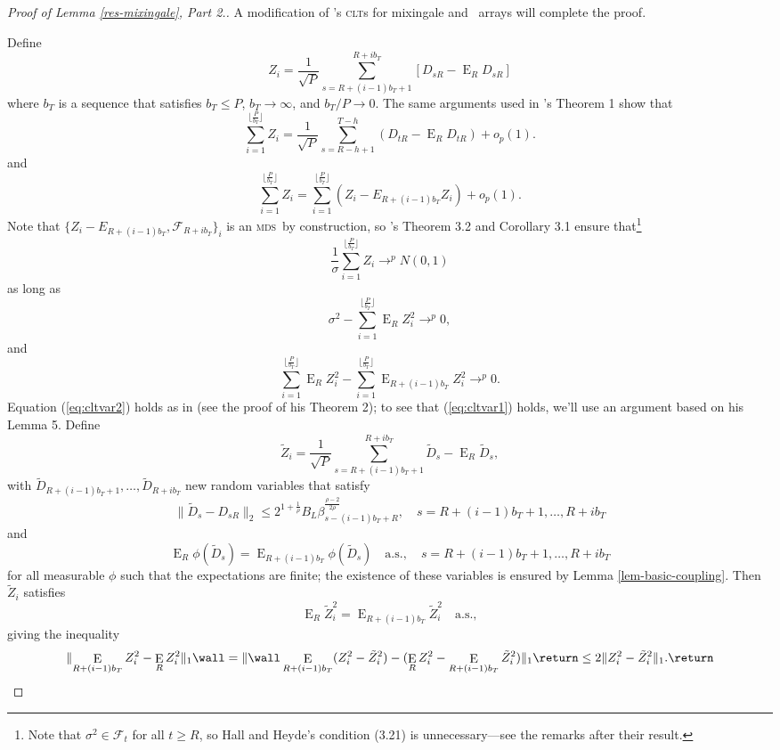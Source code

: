 \documentclass[11pt]{article}
\DeclareMathOperator{\E}{E}
\newcommand{\citepos}[1]{\citeauthor{#1}'s \citeyearpar{#1}}
\newcommand{\oosSum}[2]{\ensuremath{\sum_{#1=R-\h+#2}^{T-\h}}}
\newcommand{\h}{h}
\newcommand{\InnerBlockL}[1]{\ensuremath{R+(#1-1)b_T + 1}}
\newcommand{\InnerBlockU}[1]{\ensuremath{R+#1 b_T}}
\newcommand{\OuterBlockU}{\lfloor \frac P{b_T} \rfloor}
\newcommand{\SumOuterBlock}[1]{\ensuremath{\sum_{#1=1}^{\OuterBlockU}}}
\newcommand{\SumInnerBlock}[2]{\ensuremath{\sum_{#1=\InnerBlockL{#2}}^{\InnerBlockU{#2}}}}
\newcommand{\CEOuterBlock}[2]{\ensuremath{\E_{\InnerBlockU{(#2-1)}} #1}}
\newcommand{\ZSummand}{D_{sR} - \E_R D_{sR}}
\newcommand{\ZDef}{ \frac1{\sqrt{P}} \SumInnerBlock{s}{i} [\ZSummand]}
\newcommand{\ZSqCE}{\ensuremath{\CEOuterBlock{Z_i^2}{i}}}
\newcommand{\rhoExp}{\ensuremath{\frac{\rho-2}{2\rho}}}
\newcommand{\mds}{\textsc{mds}}
\newcommand{\clt}{\textsc{clt}}
\begin{document}
\begin{proof}[Proof of Lemma \ref{res-mixingale}, Part 2.]
  A modification of \citepos{de_jong_central_1997} \clt s for
  mixingale and \ned\ arrays will complete the proof.

Define
\[\label{eq:z1}
  Z_i = \ZDef
\]
where $b_T$ is a sequence that satisfies $b_T\leq P$,
$b_T\to\infty$, and $b_T/P\to 0$.  The same arguments used in
\citepos{de_jong_central_1997} Theorem 1 show that
\begin{equation*}
   \SumOuterBlock{i} Z_i = \frac1{\sqrt{P}} \oosSum{s}{1} (D_{tR} - \E_R D_{tR}) + o_p(1).
\end{equation*}
and
\begin{equation*}
  \SumOuterBlock{i} Z_i = \SumOuterBlock{i} (Z_i - E_{R + (i-1)b_T}
  Z_i) + o_p(1).
\end{equation*}
Note that $\{Z_i - E_{R + (i-1)b_T},\mathcal{F}_{R + i b_T}\}_i$ is an
\mds\ by construction, so \citepos{hall_martingale_1980} Theorem 3.2
and Corollary 3.1 ensure that\footnote{Note that $\sigma^2 \in
  \mathcal{F}_t$ for all $t \geq R$, so Hall and Heyde's condition
  (3.21) is unnecessary---see the remarks after their result.}
\[
\frac1{\sigma} \SumOuterBlock{i} Z_i \to^p
N(0,1)
\]
as long as
\begin{equation}\label{eq:cltvar2}
  \sigma^2 - \SumOuterBlock{i} \E_R Z_i^2 \to^p 0,
\end{equation}
and
\begin{equation}\label{eq:cltvar1}
  \SumOuterBlock{i} \E_R Z_i^2 - \SumOuterBlock{i} \ZSqCE \to^p 0.
\end{equation}
Equation (\ref{eq:cltvar2}) holds as in \citet{de_jong_central_1997}
(see the proof of his Theorem 2); to see that (\ref{eq:cltvar1})
holds, we'll use an argument based on his Lemma 5.  Define
\[
\tilde Z_i = \frac1{\sqrt{P}} \SumInnerBlock{s}{i} \tilde D_s -
\E_R \tilde D_s,
\]
with $\tilde D_{R+(i-1)b_T + 1},\dots,\tilde D_{R+ib_T}$ new random
variables that satisfy
\[
\lVert \tilde D_s - D_{sR} \rVert_2 \leq 2^{1 + \frac1\rho} B_L \beta_{s -
  (i-1)b_T + R}^{\rhoExp}, \quad s = R+(i-1)b_T + 1,\dots,R+i b_T
\]
and
\[
\E_R \phi(\tilde D_s) = \E_{R+(i-1)b_T} \phi(\tilde D_s) \quad \text{a.s.}, \quad s = R+(i-1)b_T + 1,\dots,R+i b_T
\]
for all measurable $\phi$ such that the expectations are finite; the
existence of these variables is ensured by Lemma
\ref{lem-basic-coupling}.  Then $\tilde Z_i$ satisfies
\[
\E_R \tilde Z_i^2 = \CEOuterBlock{\tilde Z_i^2}{i} \quad \text{a.s.},
\]
giving the inequality
\[
\lVert \ZSqCE - \E_R Z_i^2 \rVert_1 \wall= \lVert \wall\CEOuterBlock{(Z_i^2 -
  \tilde Z_i^2)}{i} \\ - (\E_R Z_i^2 - \CEOuterBlock{\tilde Z_i^2}{i})
\rVert_1 \return\\
\leq 2 \lVert Z_i^2 - \tilde Z_i^2 \rVert_1.
\return
\]


\end{proof}
\end{document}
